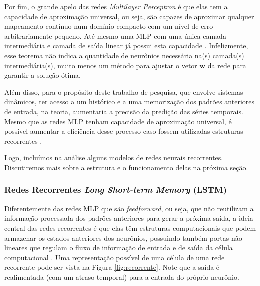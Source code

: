 \documentclass[a4paper, 12pt]{article}
\begin{document}
Por fim, o grande apelo das redes \textit{Multilayer Perceptron} é que elas tem a capacidade de aproximação universal, ou seja, são capazes de aproximar qualquer mapeamento contí\-nuo num domínio compacto com um nível de erro arbitrariamente pequeno. Até mesmo uma MLP com uma única camada intermediária e camada de saída linear já possui esta capacidade \cite{cybenko1989approximation, hornik1989multilayer}. Infelizmente, esse teorema não indica a quantidade de neurônios necessária na(s) camada(s) intermediária(s), muito menos um método para ajustar o vetor $\mathbf{w}$ da rede para garantir a solução ótima.

Além disso, para o propósito deste trabalho de pesquisa, que envolve sistemas dinâmicos, ter acesso a um histórico e a uma memorização dos padrões anteriores de entrada, na teoria, aumentaria a precisão da predição das séries temporais. Mesmo que as redes MLP tenham capacidade de aproximação universal, é possível aumentar a eficiência desse processo caso fossem utilizadas estruturas recorrentes \cite{connor1994recurrent}.

Logo, incluímos na análise alguns modelos de redes neurais recorrentes. Discutiremos mais sobre a estrutura e o funcionamento delas na próxima seção.

\subsubsection{Redes Recorrentes \textit{Long Short-term Memory} (LSTM)}
Diferentemente das redes MLP que são \textit{feedforward}, ou seja, que não reutilizam a informação processada dos padrões anteriores para gerar a próxima saída, a ideia central das redes recorrentes é que elas têm estruturas computacionais que podem armazenar os estados anteriores dos neurônios, possuindo também portas não-lineares que regulam o fluxo de informação de entrada e de saída da célula computacional \cite{haykin2010neural}. Uma representação possível de uma célula de uma rede recorrente pode ser vista na Figura \ref{fig:recorrente}. Note que a saída é realimentada (com um atraso temporal) para a entrada do próprio neurônio.
\end{document}
